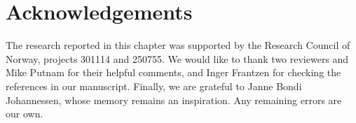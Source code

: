 \documentclass[output=paper]{langscibook}
\begin{document}
\section*{Acknowledgements}

The research reported in this chapter was supported by the Research Council of Norway, projects 301114 and 250755.  We would like to thank two reviewers and Mike Putnam for their helpful comments, and Inger Frantzen for checking the references in our manuscript. Finally, we are grateful to Janne Bondi Johannessen, whose memory remains an inspiration. Any remaining errors are our own. 

\printbibliography[heading=subbibliography]
\end{document}
